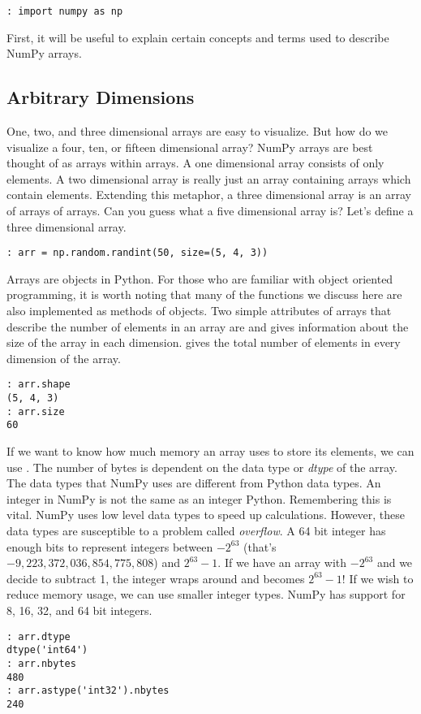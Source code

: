 \begin{lstlisting}
: import numpy as np
\end{lstlisting}
First, it will be useful to explain certain concepts and terms used to describe NumPy arrays.

\subsection*{Arbitrary Dimensions}
One, two, and three dimensional arrays are easy to visualize.
But how do we visualize a four, ten, or fifteen dimensional array?
NumPy arrays are best thought of as arrays within arrays.
A one dimensional array consists of only elements.
A two dimensional array is really just an array containing arrays which contain elements.
Extending this metaphor, a three dimensional array is an array of arrays of arrays.
Can you guess what a five dimensional array is?
Let's define a three dimensional array.

\begin{lstlisting}
: arr = np.random.randint(50, size=(5, 4, 3))
\end{lstlisting}

Arrays are objects in Python.
For those who are familiar with object oriented programming, it is worth noting that many of the functions we discuss here are also implemented as methods of  objects.
Two simple attributes of arrays that describe the number of elements in an array are  and 
 gives information about the size of the array in each dimension.
 gives the total number of elements in every dimension of the array.
\begin{lstlisting}
: arr.shape
(5, 4, 3)
: arr.size
60
\end{lstlisting}

If we want to know how much memory an array uses to store its elements, we can use .
The number of bytes is dependent on the data type or \emph{dtype} of the array.
The data types that NumPy uses are different from Python data types.
An integer in NumPy is not the same as an integer Python.
Remembering this is vital.
NumPy uses low level data types to speed up calculations.
However, these data types are susceptible to a problem called \emph{overflow}.
A 64 bit integer has enough bits to represent integers between $-2^{63}$ (that's $-9,223,372,036,854,775,808$) and $2^{63} - 1$.
If we have an array with $-2^{63}$ and we decide to subtract 1, the integer wraps around and becomes $2^{63} - 1$!  If we wish to reduce memory usage, we can use smaller integer types.
NumPy has support for 8, 16, 32, and 64 bit integers. 
\begin{lstlisting}
: arr.dtype
dtype('int64')
: arr.nbytes
480
: arr.astype('int32').nbytes
240
\end{lstlisting}

